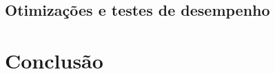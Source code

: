 \documentclass[12pt, 
openright, 
oneside, 
a4paper,    
brazil]{facom-ufu-abntex2}
\begin{document}
\section{Otimizações e testes de desempenho}







\chapter{Conclusão}
\label{sec:conclus}









\postextual










\end{document}
